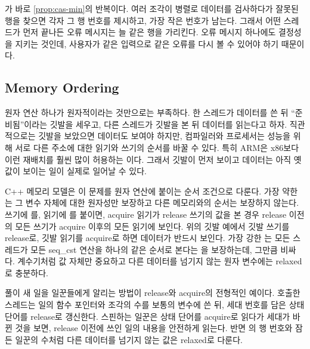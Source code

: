 \begin{instardust}
가 바로 \cref{prop:cas-min}의 반복이다. 여러 조각이 병렬로 데이터를 검사하다가 잘못된 행을 찾으면 각자 그 행 번호를 제시하고, 가장 작은 번호가 남는다. 그래서 어떤 스레드가 먼저 끝나든 오류 메시지는 늘 같은 행을 가리킨다. 오류 메시지 하나에도 결정성을 지키는 것인데, 사용자가 같은 입력으로 같은 오류를 다시 볼 수 있어야 하기 때문이다.
\end{instardust}

\subsection{Memory Ordering}

원자 연산 하나가 원자적이라는 것만으로는 부족하다. 한 스레드가 데이터를 쓴 뒤 ``준비됨''이라는 깃발을 세우고, 다른 스레드가 깃발을 본 뒤 데이터를 읽는다고 하자. 직관적으로는 깃발을 보았으면 데이터도 보여야 하지만, 컴파일러와 프로세서는 성능을 위해 서로 다른 주소에 대한 읽기와 쓰기의 순서를 바꿀 수 있다. 특히 ARM은 x86보다 이런 재배치를 훨씬 많이 허용하는 이다. 그래서 깃발이 먼저 보이고 데이터는 아직 옛 값이 보이는 일이 실제로 일어날 수 있다.

C++ 메모리 모델은 이 문제를 원자 연산에 붙이는 순서 조건으로 다룬다\cite{boehm2008cpp}. 가장 약한 는 그 변수 자체에 대한 원자성만 보장하고 다른 메모리와의 순서는 보장하지 않는다. 쓰기에 를, 읽기에 를 붙이면, acquire 읽기가 release 쓰기의 값을 본 경우 release 이전의 모든 쓰기가 acquire 이후의 모든 읽기에 보인다. 위의 깃발 예에서 깃발 쓰기를 release로, 깃발 읽기를 acquire로 하면 데이터가 반드시 보인다. 가장 강한 는 모든 스레드가 모든 seq\_cst 연산을 하나의 같은 순서로 본다는 을 보장하는데\cite{lamport1979}, 그만큼 비싸다. 계수기처럼 값 자체만 중요하고 다른 데이터를 넘기지 않는 원자 변수에는 relaxed로 충분하다.

\begin{instardust}
풀이 새 일을 일꾼들에게 알리는 방법이 release와 acquire의 전형적인 예이다. 호출한 스레드는 일의 함수 포인터와 조각의 수를 보통의 변수에 쓴 뒤, 세대 번호를 담은 상태 단어를 release로 갱신한다. 스핀하는 일꾼은 상태 단어를 acquire로 읽다가 세대가 바뀐 것을 보면, release 이전에 쓰인 일의 내용을 안전하게 읽는다. 반면 의 행 번호와 잠든 일꾼의 수처럼 다른 데이터를 넘기지 않는 값은 relaxed로 다룬다.
\end{instardust}

